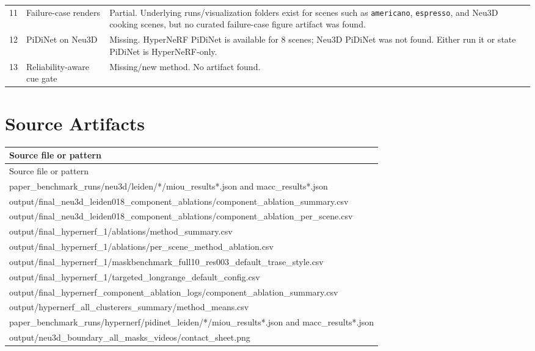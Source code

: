 \documentclass[10pt]{article}
\begin{document}
\begin{longtable}{p{0.7cm}p{7.3cm}p{7.0cm}}
11 & Failure-case renders & Partial.  Underlying runs/visualization folders exist for scenes such as \texttt{americano}, \texttt{espresso}, and Neu3D cooking scenes, but no curated failure-case figure artifact was found. \\
12 & PiDiNet on Neu3D & Missing.  HyperNeRF PiDiNet is available for 8 scenes; Neu3D PiDiNet was not found.  Either run it or state PiDiNet is HyperNeRF-only. \\
13 & Reliability-aware cue gate & Missing/new method.  No artifact found. \\
\bottomrule
\end{longtable}
\normalsize

\section{Source Artifacts}
\small
\begin{longtable}{p{15cm}}
\toprule
Source file or pattern \\
\midrule
\endfirsthead
\toprule
Source file or pattern \\
\midrule
\endhead
paper\_benchmark\_runs/neu3d/leiden/*/miou\_results*.json and macc\_results*.json \\
output/final\_neu3d\_leiden018\_component\_ablations/component\_ablation\_summary.csv \\
output/final\_neu3d\_leiden018\_component\_ablations/component\_ablation\_per\_scene.csv \\
output/final\_hypernerf\_1/ablations/method\_summary.csv \\
output/final\_hypernerf\_1/ablations/per\_scene\_method\_ablation.csv \\
output/final\_hypernerf\_1/maskbenchmark\_full10\_res003\_default\_trase\_style.csv \\
output/final\_hypernerf\_1/targeted\_longrange\_default\_config.csv \\
output/final\_hypernerf\_component\_ablation\_logs/component\_ablation\_summary.csv \\
output/hypernerf\_all\_clusterers\_summary/method\_means.csv \\
paper\_benchmark\_runs/hypernerf/pidinet\_leiden/*/miou\_results*.json and macc\_results*.json \\
output/neu3d\_boundary\_all\_masks\_videos/contact\_sheet.png \\
\bottomrule
\end{longtable}
\normalsize
\end{document}
